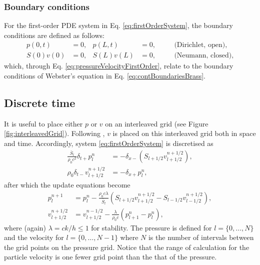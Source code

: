 {\subsubsection{Boundary conditions}
For the first-order PDE system in Eq. \eqref{eq:firstOrderSystem}, the boundary conditions are defined as follows:
\begin{subequations}
    \begin{align}\label{eq:firstOrderBoundaryConditionsCont}
        p(0,t) &= 0, &  p(L,t) &= 0, & &\quad\text{(Dirichlet, open)},\\
        S(0)v(0) &= 0, & S(L)v(L) &= 0, & &\quad \text{(Neumann, closed)},
    \end{align}
\end{subequations}
which, through Eq. \eqref{eq:pressureVelocityFirstOrder}, relate to the boundary conditions of Webster's equation in Eq. \eqref{eq:contBoundariesBrass}.

\subsection{Discrete time}
It is useful to place either $p$ or $v$ on an interleaved grid (see Figure \ref{fig:interleavedGrid}). Following \cite{Harrison2018}, $v$ is placed on this interleaved grid both in space and time. 
Accordingly, system \eqref{eq:firstOrderSystem} is discretised as
\begin{subequations}\label{eq:firstOrderFDS}
    \begin{align}
        \frac{\bar S_l}{\rho_0 c^2}\delta_{t+}p_l^n &= -\delta_{x-}(S_{l+1/2}v_{l+1/2}^{n+1/2}),\label{eq:discPressure}\\
        \rho_0 \delta_{t-}v_{l+1/2}^{n+1/2}&=-\delta_{x+}p_l^n,\label{eq:discVelocity}
    \end{align}
\end{subequations}
after which the update equations become
\begin{subequations}
    \begin{align}
        p_l^{n+1} &= p_l^n - \frac{\rho_0 c \lambda}{\bar{S}_l}(S_{l+1/2}v_{l+1/2}^{n+1/2}-S_{l-1/2}v_{l-1/2}^{n+1/2}),\label{eq:pressureUpdate}\\
        v_{l+1/2}^{n+1/2} &= v_{l+1/2}^{n-1/2}-\frac{\lambda}{\rho_0 c}(p_{l+1}^n - p_l^n),\label{eq:velocityUpdate}
    \end{align}
\end{subequations}
where (again) $\lambda = ck/h \leq 1$ for stability. The pressure is defined for $l=\{0, \hdots, N\}$ and the velocity for $l=\{0, \hdots, N-1\}$ where $N$ is the number of intervals between the grid points on the pressure grid. Notice that the range of calculation for the particle velocity is one fewer grid point than the that of the pressure.

}
